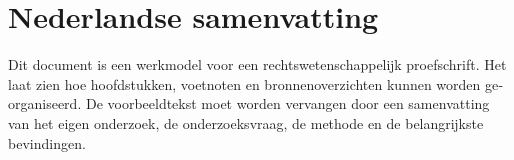 \chapter{Nederlandse samenvatting}\label{app:summary-nl}
{\large\bfseries\ThesisTranslatedTitle\par}
\medskip
{\ThesisTranslatedSubtitle\par}
\bigskip
\begin{otherlanguage}{dutch}
\noindent Dit document is een werkmodel voor een rechtswetenschappelijk
proefschrift. Het laat zien hoe hoofdstukken, voetnoten en bronnenoverzichten
kunnen worden georganiseerd. De voorbeeldtekst moet worden vervangen door een
samenvatting van het eigen onderzoek, de onderzoeksvraag, de methode en de
belangrijkste bevindingen.
\end{otherlanguage}

